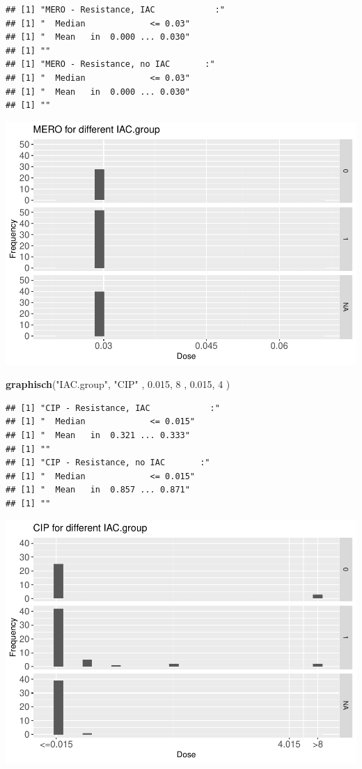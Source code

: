 \documentclass[
]{article}
\newenvironment{Shaded}{\begin{snugshade}}{\end{snugshade}}
\newcommand{\DecValTok}[1]{\textcolor[rgb]{0.00,0.00,0.81}{#1}}
\newcommand{\FloatTok}[1]{\textcolor[rgb]{0.00,0.00,0.81}{#1}}
\newcommand{\KeywordTok}[1]{\textcolor[rgb]{0.13,0.29,0.53}{\textbf{#1}}}
\newcommand{\NormalTok}[1]{#1}
\newcommand{\StringTok}[1]{\textcolor[rgb]{0.31,0.60,0.02}{#1}}
\begin{document}
\begin{verbatim}
## [1] "MERO - Resistance, IAC            :"
## [1] "  Median             <= 0.03"
## [1] "  Mean   in  0.000 ... 0.030"
## [1] ""
## [1] "MERO - Resistance, no IAC       :"
## [1] "  Median             <= 0.03"
## [1] "  Mean   in  0.000 ... 0.030"
## [1] ""
\end{verbatim}

\includegraphics{Verteilungen_files/figure-latex/unnamed-chunk-6-1.pdf}

\begin{Shaded}
\begin{Highlighting}[]
  \KeywordTok{graphisch}\NormalTok{(}\StringTok{"IAC.group"}\NormalTok{, }\StringTok{"CIP"}\NormalTok{ , }\FloatTok{0.015}\NormalTok{,   }\DecValTok{8}\NormalTok{   ,   }\FloatTok{0.015}\NormalTok{,   }\DecValTok{4}\NormalTok{     ) }
\end{Highlighting}
\end{Shaded}

\begin{verbatim}
## [1] "CIP - Resistance, IAC            :"
## [1] "  Median             <= 0.015"
## [1] "  Mean   in  0.321 ... 0.333"
## [1] ""
## [1] "CIP - Resistance, no IAC       :"
## [1] "  Median             <= 0.015"
## [1] "  Mean   in  0.857 ... 0.871"
## [1] ""
\end{verbatim}

\includegraphics{Verteilungen_files/figure-latex/unnamed-chunk-7-1.pdf}
\end{document}
